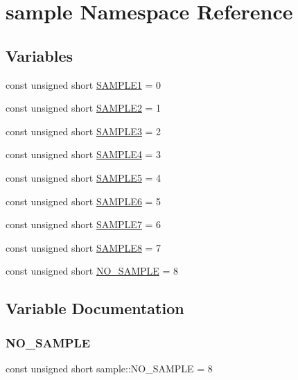 \hypertarget{namespacesample}{}\section{sample Namespace Reference}
\label{namespacesample}
\subsection*{Variables}
\begin{DoxyCompactItemize}
\item 
const unsigned short \hyperlink{namespacesample_a59478bc0929eb3127ff4ed573d5abab5}{S\+A\+M\+P\+L\+E1} = 0
\item 
const unsigned short \hyperlink{namespacesample_a74decdde1db22f406d0a0cc1857534f4}{S\+A\+M\+P\+L\+E2} = 1
\item 
const unsigned short \hyperlink{namespacesample_ac0aab16a33bfcdbd978ad2efd28cd85a}{S\+A\+M\+P\+L\+E3} = 2
\item 
const unsigned short \hyperlink{namespacesample_ac15354120ebb7dccc9ba3f548e996148}{S\+A\+M\+P\+L\+E4} = 3
\item 
const unsigned short \hyperlink{namespacesample_ae4dc2e0aefa868bda5be2fcdc695ef4e}{S\+A\+M\+P\+L\+E5} = 4
\item 
const unsigned short \hyperlink{namespacesample_af6cf4e0873f330ffdf8d341aca16d6cc}{S\+A\+M\+P\+L\+E6} = 5
\item 
const unsigned short \hyperlink{namespacesample_ad35669bc942fa6aa53d1d261f7257a3e}{S\+A\+M\+P\+L\+E7} = 6
\item 
const unsigned short \hyperlink{namespacesample_a941e99fc5405e8c43f53d75c486d0819}{S\+A\+M\+P\+L\+E8} = 7
\item 
const unsigned short \hyperlink{namespacesample_aa6106026bc40989292431c65c348a659}{N\+O\+\_\+\+S\+A\+M\+P\+LE} = 8
\end{DoxyCompactItemize}


\subsection{Variable Documentation}
\mbox{\label{namespacesample_aa6106026bc40989292431c65c348a659}} 
\subsubsection{\texorpdfstring{N\+O\+\_\+\+S\+A\+M\+P\+LE}{NO\_SAMPLE}}
{\footnotesize\ttfamily const unsigned short sample\+::\+N\+O\+\_\+\+S\+A\+M\+P\+LE = 8}



